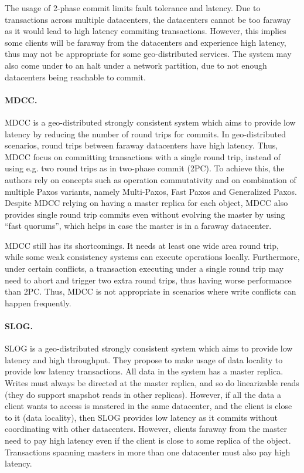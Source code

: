 The usage of 2-phase commit limits fault tolerance and latency.
Due to transactions across multiple datacenters, the datacenters cannot be too faraway as it would lead to high latency commiting transactions.
However, this implies some clients will be faraway from the datacenters and experience high latency, thus may not be appropriate for some geo-distributed services.
The system may also come under to an halt under a network partition, due to not enough datacenters being reachable to commit.

\paragraph{MDCC.} MDCC \cite{mdcc} is a geo-distributed strongly consistent system which aims to provide low latency by reducing the number of round trips for commits.
In geo-distributed scenarios, round trips between faraway datacenters have high latency.
Thus, MDCC focus on committing transactions with a single round trip, instead of using e.g. two round trips as in two-phase commit (2PC).
To achieve this, the authors rely on concepts such as operation commutativity and on combination of multiple Paxos variants, namely Multi-Paxos, Fast Paxos and Generalized Paxos.
Despite MDCC relying on having a master replica for each object, MDCC also provides single round trip commits even without evolving the master by using ``fast quorums'', which helps in case the master is in a faraway datacenter.

MDCC still has its shortcomings.
It needs at least one wide area round trip, while some weak consistency systems can execute operations locally.
Furthermore, under certain conflicts, a transaction executing under a single round trip may need to abort and trigger two extra round trips, thus having worse performance than 2PC.
Thus, MDCC is not appropriate in scenarios where write conflicts can happen frequently.

\paragraph{SLOG.} SLOG \cite{slog} is a geo-distributed strongly consistent system which aims to provide low latency and high throughput.
They propose to make usage of data locality to provide low latency transactions.
All data in the system has a master replica.
Writes must always be directed at the master replica, and so do linearizable reads (they do support snapshot reads in other replicas).
However, if all the data a client wants to access is mastered in the same datacenter, and the client is close to it (data locality), then SLOG provides low latency as it commits without coordinating with other datacenters.
However, clients faraway from the master need to pay high latency even if the client is close to some replica of the object.
Transactions spanning masters in more than one datacenter must also pay high latency.

